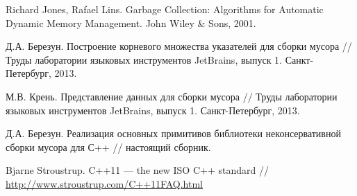 \begin{thebibliography}{99}

Richard Jones, Rafael Lins. Garbage Collection: Algorithms for Automatic Dynamic Memory Management. John Wiley \& Sons, 2001.

Д.А. Березун. Построение корневого множества указателей для сборки мусора // Труды лаборатории языковых инструментов JetBrains, 
выпуск 1. Санкт-Петербург, 2013.

М.В. Крень. Представление данных для сборки мусора // Труды лаборатории языковых инструментов JetBrains, выпуск 1. Санкт-Петербург, 2013.


Д.А. Березун. Реализация основных примитивов библиотеки неконсервативной сборки мусора для С++ // настоящий сборник.

Bjarne Stroustrup. C++11 --- the new ISO C++ standard // \url{http://www.stroustrup.com/C++11FAQ.html}

\end{thebibliography}

